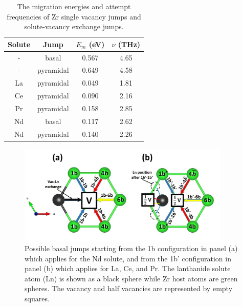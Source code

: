 \documentclass[preprint,12pt]{elsarticle}
\providecommand{\DIFaddbeginFL}{} %
\providecommand{\DIFaddendFL}{} %
\providecommand{\DIFdelbeginFL}{} %
\providecommand{\DIFdelendFL}{} %
\newcommand{\DIFscaledelfig}{0.5}
\newlength{\DIFdelgraphicswidth} %
\newlength{\DIFdelgraphicsheight} %
\newcommand{\DIFaddincludegraphics}[2][]{{\color{blue}\fbox{\DIFOincludegraphics[#1]{#2}}}} %
\newcommand{\DIFdelincludegraphics}[2][]{%
\sbox{\DIFdelgraphicsbox}{\DIFOincludegraphics[#1]{#2}}%
\settoboxwidth{\DIFdelgraphicswidth}{\DIFdelgraphicsbox} %
\settoboxtotalheight{\DIFdelgraphicsheight}{\DIFdelgraphicsbox} %
\scalebox{\DIFscaledelfig}{%
\parbox[b]{\DIFdelgraphicswidth}{\usebox{\DIFdelgraphicsbox}\\[-\baselineskip] \rule{\DIFdelgraphicswidth}{0em}}\llap{\resizebox{\DIFdelgraphicswidth}{\DIFdelgraphicsheight}{%
\setlength{\unitlength}{\DIFdelgraphicswidth}%
\begin{picture}(1,1)%
\thicklines\linethickness{2pt} %
{\color[rgb]{1,0,0}\put(0,0){\framebox(1,1){}}}%
{\color[rgb]{1,0,0}\put(0,0){\line( 1,1){1}}}%
{\color[rgb]{1,0,0}\put(0,1){\line(1,-1){1}}}%
\end{picture}%
}\hspace*{3pt}}} %
} %
\DeclareRobustCommand{\DIFaddbeginFL}{\DIFOaddbeginFL \let\includegraphics\DIFaddincludegraphics} %
\DeclareRobustCommand{\DIFaddendFL}{\DIFOaddendFL \let\includegraphics\DIFOincludegraphics} %
\DeclareRobustCommand{\DIFdelbeginFL}{\DIFOdelbeginFL \let\includegraphics\DIFdelincludegraphics} %
\DeclareRobustCommand{\DIFdelendFL}{\DIFOaddendFL \let\includegraphics\DIFOincludegraphics} %
\begin{document}
\begin{table}[h!]
    \centering
    \caption{The migration energies and attempt frequencies of Zr single vacancy jumps and solute-vacancy exchange jumps.}
    \begin{tabular}{c|c|c|c}
    \toprule
        Solute & Jump & $E_m$ (eV) & $\nu$ (THz) \\
        \hline
       -  &basal&0.567 & 4.65\\
       - &pyramidal &0.649 & 4.58\\
       \hline
       La&pyramidal &0.049 &1.81 \\
       Ce&pyramidal &0.090 &2.16 \\
       Pr&pyramidal &0.158 &2.85 \\
       Nd&basal &0.117 &2.62 \\
       Nd&pyramidal &0.140 &2.26 \\
       \bottomrule
    \end{tabular}
    \label{tab:jumps}
\end{table}

\begin{figure}[h!]
    \centering
    \DIFdelbeginFL %
\DIFdelendFL \DIFaddbeginFL \includegraphics[width=0.9\textwidth]{2_basal_jumps_1b_1bb.jpg}
    \DIFaddendFL \caption{Possible basal jumps starting from the 1b configuration in panel (a) which applies for the Nd solute, and from the 1b' configuration in panel (b) which applies for La, Ce, and Pr. The lanthanide solute atom (Ln) is shown as a black sphere while Zr host atoms are green spheres. The vacancy and half vacancies are represented by empty squares. }
    \label{fig:basal_jumps_1b_and_1bb}
\end{figure}
\end{document}
